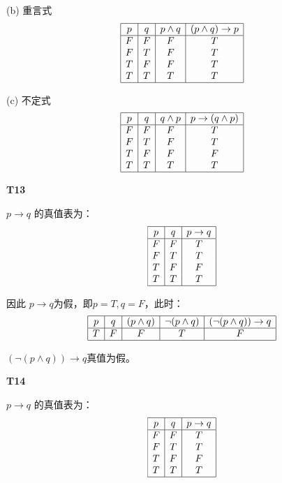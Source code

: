 \documentclass[12pt, a4paper]{ctexart}
\begin{document}
(b) 重言式
\[
\begin{array}{|c|c|c|c|}
    \hline
    p & q & p \land q & (p \land q) \rightarrow p\\
    \hline
    F & F & F & T\\
    F & T & F & T\\
    T & F & F & T\\
    T & T & T & T\\
    \hline    
\end{array}
\]

(c) 不定式
\[
\begin{array}{|c|c|c|c|}
    \hline
    p & q & q \land p & p \rightarrow (q \land p)\\
    \hline
    F & F & F & T\\
    F & T & F & T\\
    T & F & F & F\\
    T & T & T & T\\
    \hline
\end{array}
\]

\textbf{T13}

$p \rightarrow q$ 的真值表为：\[
\begin{array}{|c|c|c|}
    \hline
    p & q & p \rightarrow q\\
    \hline
    F & F & T\\
    F & T & T\\
    T & F & F\\
    T & T & T\\
    \hline    
\end{array}
\]

因此 $p \rightarrow q$为假，即$p = T, q = F$，此时：
\[
\begin{array}{|c|c|c|c|c|}
    \hline
    p & q & (p \land q) & \lnot (p \land q) & (\lnot (p \land q)) \rightarrow q\\
    \hline
    T & F & F & T & F\\
    \hline
\end{array}
\]

$(\lnot (p \land q)) \rightarrow q$真值为假。

\textbf{T14}

$p \rightarrow q$ 的真值表为：\[
\begin{array}{|c|c|c|}
    \hline
    p & q & p \rightarrow q\\
    \hline
    F & F & T\\
    F & T & T\\
    T & F & F\\
    T & T & T\\
    \hline    
\end{array}
\]
\end{document}
